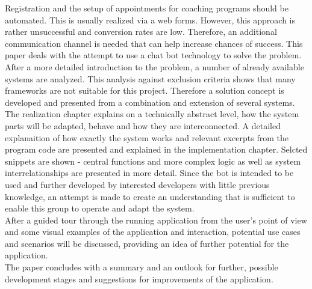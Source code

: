 Registration and the setup of appointments for coaching programs should be automated. This is usually realized via a web forms. However, this approach is rather unsuccessful and conversion rates are low. Therefore, an additional communication channel is needed that can help increase chances of success. This paper deals with the attempt to use a chat bot technology to solve the problem. After a more detailed introduction to the problem, a number of already available systems are analyzed. This analysis against exclusion criteria shows that many frameworks are not suitable for this project. Therefore a solution concept is developed and presented from a combination and extension of several systems. The realization chapter explains on a technically abstract level, how the system parts will be adapted, behave and how they are interconnected. A detailed explanaition of how exactly the system works and relevant excerpts from the program code are presented and explained in the implementation chapter. Selcted snippets are shown - central functions and more complex logic as well as system interrelationships are presented in more detail. Since the bot is intended to be used and further developed by interested developers with little previous knowledge, an attempt is made to create an understanding that is sufficient to enable this group to operate and adapt the system. \\
After a guided tour through the running application from the user's point of view and some visual examples of the application and interaction, potential use cases and scenarios will be discussed, providing an idea of further potential for the application. \\
The paper concludes with a summary and an outlook for further, possible development stages and suggestions for improvements of the application.